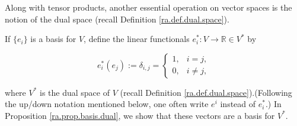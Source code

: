 Along with tensor products, another essential operation on vector spaces is the notion of the dual space (recall Definition \ref{ra.def.dual.space}). 

\begin{definition}\label{ra.def.basis.dual}

If \(\{e_i\}\) is a basis for \(V\), define the linear functionals \(e_i^*: V \to \mathbb{R} \in V^*\) by 

\[
e_i^*(e_j) := \delta_{i,j} = \begin{cases}
1, & i = j, \\
0, & i \neq j,
\end{cases}
\] 

where \(V^*\) is the dual space of \(V\) (recall Definition \ref{ra.def.dual.space}).(Following the up/down notation mentioned below, one often write \(e^i\) instead of \(e_i^*\).) In Proposition \ref{ra.prop.basis.dual}, we show that these vectors are a basis for \(V^*\).

\end{definition}





